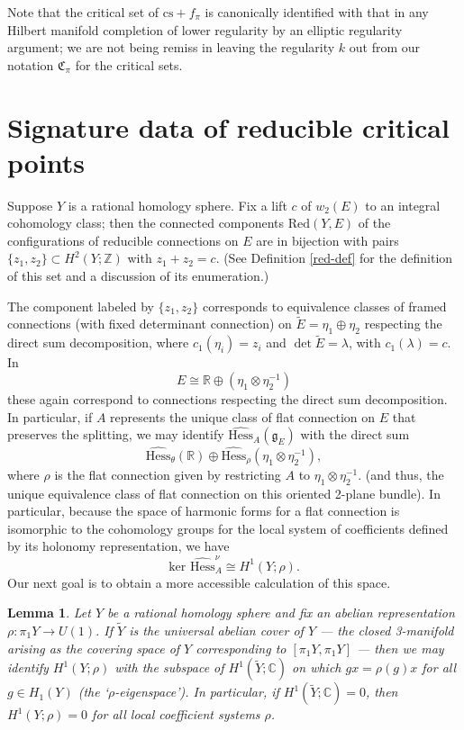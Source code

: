 \documentclass[10pt,a4paper]{amsart}
\newtheorem{lemma}[theorem]{Lemma}
\theoremstyle{definition}
\theoremstyle{remark}
\numberwithin{figure}{qchap}
\begin{document}
Note that the critical set of $\text{cs}+f_\pi$ is canonically identified with that in any Hilbert manifold completion of lower regularity by an elliptic regularity argument; we are not being remiss in leaving the regularity $k$ out from our notation $\mathfrak C_\pi$ for the critical sets.

\section{Signature data of reducible critical points}\label{sec:3d-sigdata}
Suppose $Y$ is a rational homology sphere. Fix a lift $c$ of $w_2(E)$ to an integral cohomology class; then the connected components $\text{Red}(Y,E)$ of the configurations of reducible connections on $E$ are in bijection with pairs $\{z_1, z_2\} \subset H^2(Y;\mathbb Z)$ with $z_1 + z_2 = c$. (See Definition \ref{red-def} for the definition of this set and a discussion of its enumeration.) 

The component labeled by $\{z_1, z_2\}$ corresponds to equivalence classes of framed connections (with fixed determinant connection) on $\tilde E = \eta_1 \oplus \eta_2$ respecting the direct sum decomposition, where $c_1(\eta_i) = z_i$ and $\det \tilde E = \lambda$, with $c_1(\lambda) = c$. In 
$$E \cong \mathbb R \oplus (\eta_1 \otimes \eta_2^{-1})$$ 
these again correspond to connections respecting the direct sum decomposition. In particular, if $A$ represents the unique class of flat connection on $E$ that preserves the splitting, we may identify $\widehat{\text{Hess}}_A(\mathfrak g_E)$ with the direct sum 
$$\widehat{\text{Hess}}_\theta(\mathbb R) \oplus \widehat{\text{Hess}}_\rho(\eta_1 \otimes \eta_2^{-1}),$$ 
where $\rho$ is the flat connection given by restricting $A$ to $\eta_1 \otimes \eta_2^{-1}$. (and thus, the unique equivalence class of flat connection on this oriented 2-plane bundle). In particular, because the space of harmonic forms for a flat connection is isomorphic to the cohomology groups for the local system of coefficients defined by its holonomy representation, we have $$\text{ker } \widehat{\text{Hess}}^\nu_A \cong H^1(Y;\rho).$$ Our next goal is to obtain a more accessible calculation of this space.

\begin{lemma}Let $Y$ be a rational homology sphere and fix an abelian representation $\rho: \pi_1 Y \to U(1)$. If $\tilde Y$ is the universal abelian cover of $Y$ --- the closed 3-manifold arising as the covering space of $Y$ corresponding to $[\pi_1 Y, \pi_1 Y]$ --- then we may identify $H^1(Y; \rho)$ with the subspace of $H^1(\tilde Y; \mathbb C)$ on which $gx = \rho(g) x$ for all $g \in H_1(Y)$ (the `$\rho$-eigenspace'). In particular, if $H^1(\tilde Y; \mathbb C) = 0$, then $H^1(Y; \rho) = 0$ for all local coefficient systems $\rho$.
\end{lemma}
\end{document}
